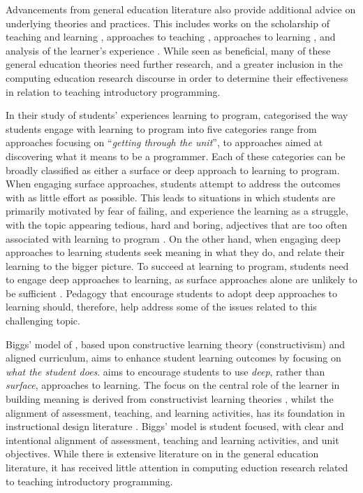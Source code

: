 Advancements from general education literature also provide additional advice on underlying theories and practices. This includes works on the scholarship of teaching and learning \cite{Boyer:1990}, approaches to teaching \cite{Martin:2000}, approaches to learning \cite{Marton:1976a,Marton:1984,Entwistle:1991,Trigwell:1991,Trigwell:1999}, and analysis of the learner's experience \cite{Marton:1997}. While seen as beneficial, many of these general education theories need further research, and a greater inclusion in the computing education research discourse in order to determine their effectiveness in relation to teaching introductory programming.

 In their study of students' experiences learning to program, \citet{Bruce:2003} categorised the way students engage with learning to program into five categories range from approaches focusing on ``\emph{getting through the unit}'', to approaches aimed at discovering what it means to be a programmer. Each of these categories can be broadly classified as either a surface or deep approach to learning \cite{Marton:1976a,Ramsden:1992} to program. When engaging surface approaches, students attempt to address the outcomes with as little effort as possible. This leads to situations in which students are primarily motivated by fear of failing, and experience the learning as a struggle, with the topic appearing tedious, hard and boring, adjectives that are too often associated with learning to program \cite{McGettrick:2005}. On the other hand, when engaging deep approaches to learning students seek meaning in what they do, and relate their learning to the bigger picture. To succeed at learning to program, students need to engage deep approaches to learning, as surface approaches alone are unlikely to be sufficient \cite{Bruce:2003}. Pedagogy that encourage students to adopt deep approaches to learning should, therefore, help address some of the issues related to this challenging topic.

Biggs' model of \CA \cite{Biggs:1996c,Biggs:2007}, based upon constructive learning theory (constructivism) and aligned curriculum, aims to enhance student learning outcomes by focusing on \emph{what the student does}. \CA aims to encourage students to use \emph{deep}, rather than \emph{surface}, approaches to learning. The focus on the central role of the learner in building meaning is derived from constructivist learning theories , whilst the alignment of assessment, teaching, and learning activities, has its foundation in instructional design literature \cite{Cohen:1987} . Biggs' model is student focused, with clear and intentional alignment of assessment, teaching and learning activities, and unit objectives. While there is extensive literature on \CA in the general education literature, it has received little attention in computing eduction research related to teaching introductory programming. 

